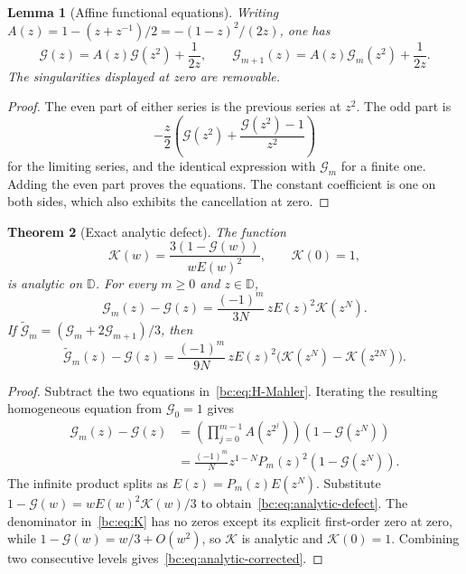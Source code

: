 \documentclass[11pt,a4paper,oneside,openany]{book}
\numberwithin{equation}{chapter}
\newtheorem{theorem}{Theorem}[chapter]
\newtheorem{lemma}[theorem]{Lemma}
\theoremstyle{definition}
\theoremstyle{remark}
\newcommand{\Ht}{\widetilde{\mathcal G}}
\begin{document}
\begin{lemma}[Affine functional equations]
\label{bc:lem:MahlerH}
Writing $A(z)=1-(z+z^{-1})/2=-(1-z)^2/(2z)$, one has
\begin{equation}
 \mathcal G(z)=A(z)\mathcal G(z^2)+\frac1{2z},\qquad
 \mathcal G_{m+1}(z)=A(z)\mathcal G_m(z^2)+\frac1{2z}.
 \label{bc:eq:H-Mahler}
\end{equation}
The singularities displayed at zero are removable.
\end{lemma}
\begin{proof}
The even part of either series is the previous series at $z^2$. The odd part is
\[
 -\frac z2\left(\mathcal G(z^2)+\frac{\mathcal G(z^2)-1}{z^2}\right)
\]
for the limiting series, and the identical expression with $\mathcal G_m$ for a finite
one. Adding the even part proves the equations. The constant coefficient is
one on both sides, which also exhibits the cancellation at zero.
\end{proof}

\begin{theorem}[Exact analytic defect]
\label{bc:thm:analytic}
The function
\begin{equation}
 \mathcal K(w)=\frac{3(1-\mathcal G(w))}{wE(w)^2},\qquad \mathcal K(0)=1,
 \label{bc:eq:K}
\end{equation}
is analytic on $\mathbb D$. For every $m\ge0$ and $z\in\mathbb D$,
\begin{equation}
 \boxed{\quad \mathcal G_m(z)-\mathcal G(z)
 =\frac{(-1)^m}{3N}\,zE(z)^2\mathcal K(z^N).\quad}
 \label{bc:eq:analytic-defect}
\end{equation}
If $\Ht_m=(\mathcal G_m+2\mathcal G_{m+1})/3$, then
\begin{equation}
 \Ht_m(z)-\mathcal G(z)
 =\frac{(-1)^m}{9N}\,zE(z)^2
       \bigl(\mathcal K(z^N)-\mathcal K(z^{2N})\bigr).
 \label{bc:eq:analytic-corrected}
\end{equation}
\end{theorem}
\begin{proof}
Subtract the two equations in~\eqref{bc:eq:H-Mahler}. Iterating the resulting
homogeneous equation from $\mathcal G_0=1$ gives
\begin{align*}
 \mathcal G_m(z)-\mathcal G(z)
 &=\left(\prod_{j=0}^{m-1}A(z^{2^j})\right)(1-\mathcal G(z^N))\\
 &=\frac{(-1)^m}{N}z^{1-N}P_m(z)^2(1-\mathcal G(z^N)).
\end{align*}
The infinite product splits as $E(z)=P_m(z)E(z^N)$. Substitute
$1-\mathcal G(w)=wE(w)^2\mathcal K(w)/3$ to obtain~\eqref{bc:eq:analytic-defect}.
The denominator in~\eqref{bc:eq:K} has no zeros except its explicit first-order
zero at zero, while $1-\mathcal G(w)=w/3+O(w^2)$, so $\mathcal K$ is analytic and $\mathcal K(0)=1$.
Combining two consecutive levels gives~\eqref{bc:eq:analytic-corrected}.
\end{proof}
\end{document}
